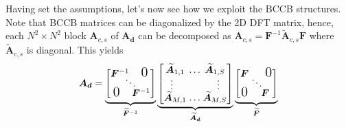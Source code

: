 \documentclass{article}
\begin{document}
Having set the assumptions, let's now see how we exploit the BCCB structures.
Note that BCCB matrices can be diagonalized by the 2D DFT matrix, hence, each
$N^2 \times N^2$ block $\bm A_{c,s}$ of $\bm {A_d}$ can be decomposed as $\bm
A_{c,s} = \bm F^{-1} \widetilde{\bm A}_{c,s} \bm F$ where $\widetilde{\bm
A}_{c,s}$ is diagonal. This yields
\vspace{-0.1 in}
\begin{equation}
  \bm {A_d}=
  \underbrace{
    \begin{bmatrix}
      \bm F^{-1} \hspace{-0.2 in}& \hspace{-0.2 in} & \hspace{-0.1 in} \vspace{-0.1 in}\text{\Large 0} \\
        \vspace{-0.05 in}& \ddots &  \\
      \text{\Large 0} \hspace{-0.1 in}& \hspace{-0.2 in} & \hspace{-0.2 in} \bm F^{-1}
    \end{bmatrix}
  }_{\widetilde{\bm F}^{-1}}
  \underbrace{
    \begin{bmatrix}
      \widetilde{\bm A}_{1,1} \hspace{-0.1 in}& \hdots & \hspace{-0.1 in} \widetilde{\bm A}_{1,S} \vspace{-0.02 in}\\
      \vspace{-0.02 in}\vdots & & \vdots \\
      \widetilde{\bm A}_{M,1} \hspace{-0.1 in}& \hdots & \hspace{-0.1 in} \widetilde{\bm A}_{M,S} \\
    \end{bmatrix}
  }_{\widetilde{\bm A}_{\bm d}}
  \underbrace{
    \begin{bmatrix}
      \bm F \hspace{-0.1 in}& \hspace{-0.2 in} & \hspace{-0.1 in} \vspace{-0.1 in}\text{\Large 0} \\
        \vspace{-0.05 in}& \ddots &  \\
      \text{\Large 0} \hspace{-0.1 in}& \hspace{-0.2 in} & \hspace{-0.2 in} \bm F
    \end{bmatrix}
  }_{\widetilde{\bm F}}
\label{eq:fourier_mtx}
\end{equation}
\vspace{-0.1 in}
\end{document}
